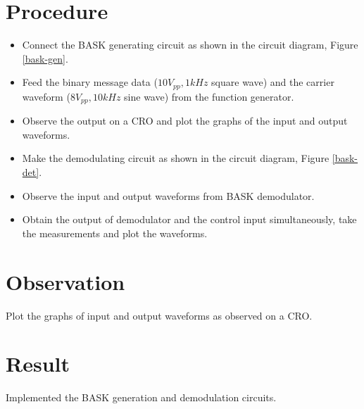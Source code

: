 \section*{Procedure}
\begin{itemize}
\item
Connect the BASK generating circuit as shown in the circuit diagram, Figure \ref{bask-gen}.
\item
Feed the binary message data ($10 V_{pp}, 1 kHz$ square wave) and the carrier waveform  ($8 V_{pp}, 10 kHz$ sine wave) from the function generator.
\item
Observe the output on a CRO and plot the graphs of the input and output waveforms.
\item
Make the demodulating circuit as shown in the circuit diagram, Figure \ref{bask-det}.
\item
Observe the input and output waveforms from BASK demodulator.
\item 
Obtain the output of demodulator and the control input simultaneously, take the measurements and plot the waveforms.

\end{itemize}
\section*{Observation}
Plot the graphs of input and output waveforms as observed on a CRO.
\section*{Result}

Implemented the BASK generation and demodulation circuits.